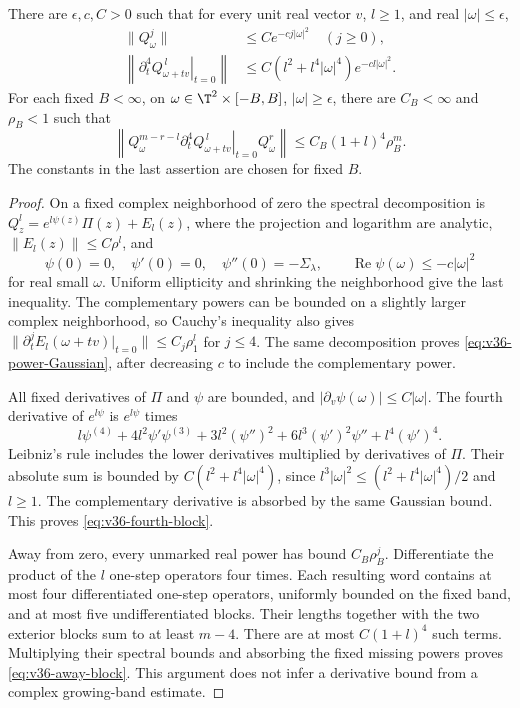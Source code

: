 \begin{lemma}
\label{lem:v36-differentiated-block}
There are $\epsilon,c,C>0$ such that for every unit real vector $v$,
$l\ge1$, and real $|\omega|\le\epsilon$,
\begin{align}
 \|Q_\omega^j\|&\le Ce^{-cj|\omega|^2}\quad(j\ge0),
                                            \label{eq:v36-power-Gaussian}\\
 \left\|\left.\partial_t^4Q_{\omega+tv}^{\,l}\right|_{t=0}\right\|
 &\le C(l^2+l^4|\omega|^4)e^{-cl|\omega|^2}.
                                            \label{eq:v36-fourth-block}
\end{align}
For each fixed $B<\infty$, on
$\omega\in\T^2\times[-B,B]$, $|\omega|\ge\epsilon$, there are
$C_B<\infty$ and $\rho_B<1$ such that
\begin{equation}\label{eq:v36-away-block}
 \left\|Q_\omega^{m-r-l}
   \left.\partial_t^4Q_{\omega+tv}^{\,l}\right|_{t=0}
                   Q_\omega^r\right\|
       \le C_B(1+l)^4\rho_B^{m}.
\end{equation}
The constants in the last assertion are chosen for fixed $B$.
\end{lemma}
\begin{proof}
On a fixed complex neighborhood of zero the spectral decomposition is
$Q_z^l=e^{l\psi(z)}\Pi(z)+E_l(z)$, where the projection and logarithm
are analytic, $\|E_l(z)\|\le C\rho^l$, and
\[
 \psi(0)=0,\quad \psi'(0)=0,\quad
 \psi''(0)=-\Sigma_\lambda,
 \qquad \operatorname{Re}\psi(\omega)\le-c|\omega|^2
\]
for real small $\omega$. Uniform ellipticity and shrinking the
neighborhood give the last inequality. The complementary powers can
be bounded on a slightly larger complex neighborhood, so Cauchy's
inequality also gives $\|\partial_t^jE_l(\omega+tv)|_{t=0}\|
\le C_j\rho_1^l$ for $j\le4$. The same decomposition proves
\eqref{eq:v36-power-Gaussian}, after decreasing $c$ to include the
complementary power.

All fixed derivatives of $\Pi$ and $\psi$ are bounded, and
$|\partial_v\psi(\omega)|\le C|\omega|$. The fourth derivative of
$e^{l\psi}$ is $e^{l\psi}$ times
\[
 l\psi^{(4)}+4l^2\psi'\psi^{(3)}
 +3l^2(\psi'')^2+6l^3(\psi')^2\psi''+l^4(\psi')^4.
\]
Leibniz's rule includes the lower derivatives multiplied by derivatives
of $\Pi$. Their absolute sum is bounded by
$C(l^2+l^4|\omega|^4)$, since
$l^3|\omega|^2\le(l^2+l^4|\omega|^4)/2$ and $l\ge1$.
The complementary derivative is absorbed by the same Gaussian bound.
This proves \eqref{eq:v36-fourth-block}.

Away from zero, every unmarked real power has bound $C_B\rho_B^j$.
Differentiate the product of the $l$ one-step operators four times.
Each resulting word contains at most four differentiated one-step
operators, uniformly bounded on the fixed band, and at most five
undifferentiated blocks. Their lengths together with the two exterior
blocks sum to at least $m-4$. There are at most $C(1+l)^4$ such terms.
Multiplying their spectral bounds and absorbing the fixed missing
powers proves \eqref{eq:v36-away-block}. This argument does not infer
a derivative bound from a complex growing-band estimate.
\end{proof}

